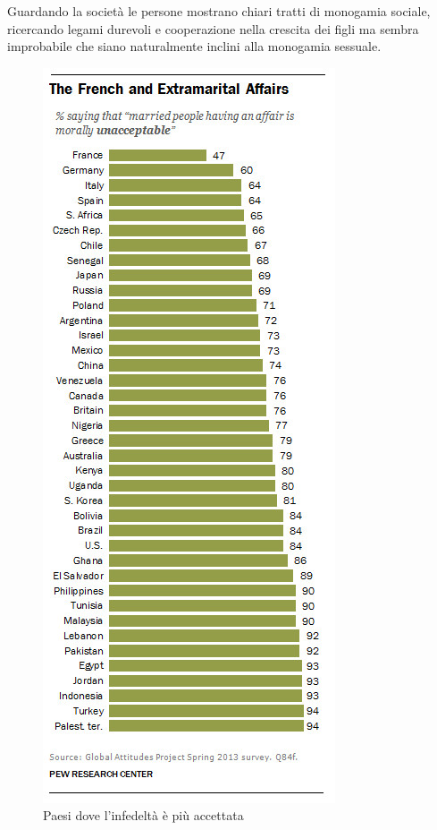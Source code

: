 \documentclass[12pt]{book} %
\begin{document}
Guardando la società le persone mostrano chiari tratti di monogamia sociale, ricercando legami durevoli e cooperazione
nella crescita dei figli ma sembra improbabile che siano naturalmente inclini alla monogamia sessuale. 

\needspace{4cm}
\begin{figure}
  \centering
  \includegraphics[width=0.95\linewidth]{images/Libro-img016.jpg}
  \begin{minipage}{\linewidth}
    \caption{Paesi dove l'infedeltà è più accettata}
  \end{minipage}
\end{figure}
\end{document}
